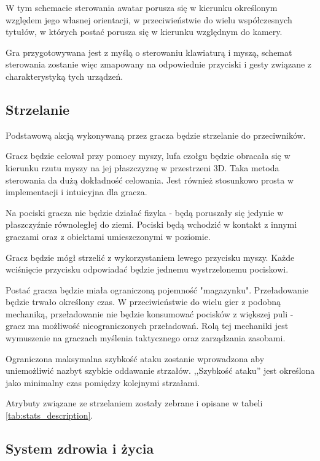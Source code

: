 W tym schemacie sterowania awatar porusza się w kierunku określonym względem jego własnej orientacji, w przeciwieństwie do wielu współczesnych tytułów, w których postać porusza się w kierunku względnym do kamery. 

Gra przygotowywana jest z myślą o sterowaniu klawiaturą i myszą, schemat sterowania zostanie więc zmapowany na odpowiednie przyciski i gesty związane z charakterystyką tych urządzeń. 


\subsection{Strzelanie}\label{sec:shooting_concept}

Podstawową akcją wykonywaną przez gracza będzie strzelanie do przeciwników.

Gracz będzie celował przy pomocy myszy, lufa czołgu będzie obracała się w kierunku rzutu myszy na jej płaszczyznę w przestrzeni 3D.
Taka metoda sterowania da dużą dokładność celowania. Jest również stosunkowo prosta w implementacji i intuicyjna dla gracza.

Na pociski gracza nie będzie działać fizyka - będą poruszały się jedynie w płaszczyźnie równoległej do ziemi. Pociski będą wchodzić w kontakt z innymi graczami oraz z obiektami umieszczonymi w poziomie.

Gracz będzie mógł strzelić z wykorzystaniem lewego przycisku myszy. Każde wciśnięcie przycisku odpowiadać będzie jednemu wystrzelonemu pociskowi.

Postać gracza będzie miała ograniczoną pojemność "magazynku". Przeładowanie będzie trwało określony czas. W przeciwieństwie do wielu gier z podobną mechaniką, przeładowanie nie będzie konsumować pocisków z większej puli - gracz ma możliwość nieograniczonych przeładowań. Rolą tej mechaniki jest wymuszenie na graczach myślenia taktycznego oraz zarządzania zasobami.


Ograniczona maksymalna szybkość ataku zostanie wprowadzona aby uniemożliwić nazbyt szybkie oddawanie strzałów. ,,Szybkość ataku'' jest określona jako minimalny czas pomiędzy kolejnymi strzałami.

Atrybuty związane ze strzelaniem zostały zebrane i opisane w tabeli \ref{tab:stats_description}. 

\subsection{System zdrowia i życia}

